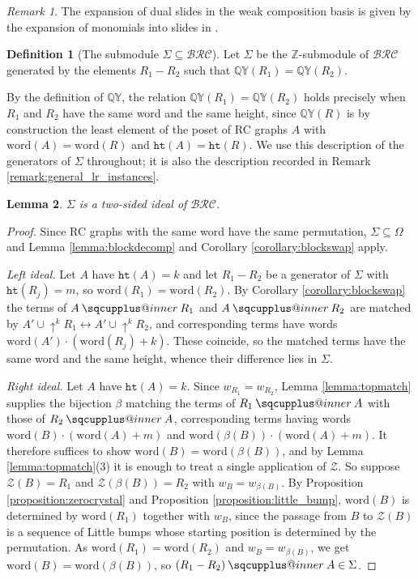 \documentclass{amsart}
\makeatletter
\newcommand{\sqcupplus@inner}[2]{%
  \vcenter{\hbox{\ooalign{%
    \hfil$\m@th#1\sqcup$\hfil\cr
    \hfil\raisebox{0.15ex}{$\m@th#1\scriptscriptstyle+$}\hfil\cr
  }}}%
}
\newcommand{\sqcupplus}{\mathbin{\mathpalette\sqcupplus@inner\relax}}
\newtheorem{lemma}{Lemma}[subsection]
\theoremstyle{definition}
\newtheorem{definition}[lemma]{Definition}
\theoremstyle{remark}
\newtheorem*{remark}{Remark}
\numberwithin{equation}{subsection}
\newcommand{\shup}{{\uparrow}}
\newcommand{\wof}[1]{w_{#1}}
\newcommand{\QY}{\ensuremath{\mathbb{QY}}}
\newcommand{\zeromap}{\mathcal{Z}}
\newcommand{\hr}{\mathtt{ht}}
\newcommand{\BRC}{\mathcal{BRC}}
\makeatother
\begin{document}
\begin{remark}
The expansion of dual slides in the weak composition basis is given by the expansion of monomials into slides in \cite[Theorem~5.2]{nadeau2024ppartitions}.
\end{remark}

\begin{definition}[The submodule $\Sigma\subseteq \BRC$]
Let $\Sigma$ be the $\mathbb{Z}$-submodule of $\BRC$ generated by the elements $R_1-R_2$ such that $\QY(R_1)=\QY(R_2)$.
\end{definition}

By the definition of $\QY$, the relation $\QY(R_1)=\QY(R_2)$ holds precisely when $R_1$ and $R_2$ have the same word and the same height, since $\QY(R)$ is by construction the least element of the poset of RC graphs $A$ with $\mathrm{word}(A)=\mathrm{word}(R)$ and $\hr(A)=\hr(R)$. We use this description of the generators of $\Sigma$ throughout; it is also the description recorded in Remark \ref{remark:general_lr_instances}.

\begin{lemma}\label{lemma:slideideal}
$\Sigma$ is a two-sided ideal of $\BRC$.
\end{lemma}
\begin{proof}
Since RC graphs with the same word have the same permutation, $\Sigma\subseteq\Omega$ and Lemma \ref{lemma:blockdecomp} and Corollary \ref{corollary:blockswap} apply.

\emph{Left ideal.} Let $A$ have $\hr(A)=k$ and let $R_1-R_2$ be a generator of $\Sigma$ with $\hr(R_j)=m$, so $\mathrm{word}(R_1)=\mathrm{word}(R_2)$. By Corollary \ref{corollary:blockswap} the terms of $A\sqcupplus R_1$ and $A\sqcupplus R_2$ are matched by $A'\cup\shup^{k}R_1\leftrightarrow A'\cup\shup^{k}R_2$, and corresponding terms have words $\mathrm{word}(A')\cdot(\mathrm{word}(R_j)+k)$. These coincide, so the matched terms have the same word and the same height, whence their difference lies in $\Sigma$.

\emph{Right ideal.} Let $A$ have $\hr(A)=k$. Since $\wof{R_1}=\wof{R_2}$, Lemma \ref{lemma:topmatch} supplies the bijection $\beta$ matching the terms of $R_1\sqcupplus A$ with those of $R_2\sqcupplus A$, corresponding terms having words $\mathrm{word}(B)\cdot(\mathrm{word}(A)+m)$ and $\mathrm{word}(\beta(B))\cdot(\mathrm{word}(A)+m)$. It therefore suffices to show $\mathrm{word}(B)=\mathrm{word}(\beta(B))$, and by Lemma \ref{lemma:topmatch}(3) it is enough to treat a single application of $\zeromap$. So suppose $\zeromap(B)=R_1$ and $\zeromap(\beta(B))=R_2$ with $\wof B=\wof{\beta(B)}$. By Proposition \ref{proposition:zerocrystal} and Proposition \ref{proposition:little_bump}, $\mathrm{word}(B)$ is determined by $\mathrm{word}(R_1)$ together with $\wof B$, since the passage from $B$ to $\zeromap(B)$ is a sequence of Little bumps whose starting position is determined by the permutation. As $\mathrm{word}(R_1)=\mathrm{word}(R_2)$ and $\wof B=\wof{\beta(B)}$, we get $\mathrm{word}(B)=\mathrm{word}(\beta(B))$, so $(R_1-R_2)\sqcupplus A\in\Sigma$.
\end{proof}
\end{document}
